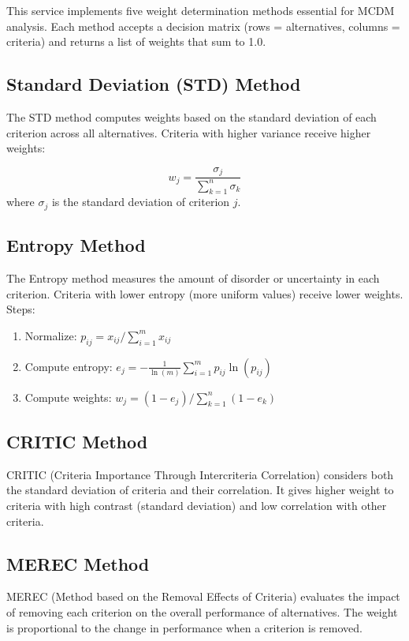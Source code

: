 \documentclass[12pt,a4paper,oneside]{report}
\begin{document}
This service implements five weight determination methods essential for MCDM analysis. Each method accepts a decision matrix (rows = alternatives, columns = criteria) and returns a list of weights that sum to 1.0.

\subsection{Standard Deviation (STD) Method}

The STD method computes weights based on the standard deviation of each criterion across all alternatives. Criteria with higher variance receive higher weights:

\begin{equation}
w_j = \frac{\sigma_j}{\sum_{k=1}^{n} \sigma_k}
\end{equation}
where $\sigma_j$ is the standard deviation of criterion $j$.

\subsection{Entropy Method}

The Entropy method measures the amount of disorder or uncertainty in each criterion. Criteria with lower entropy (more uniform values) receive lower weights. Steps:
\begin{enumerate}
  \item Normalize: $p_{ij} = x_{ij} / \sum_{i=1}^{m} x_{ij}$
  \item Compute entropy: $e_j = -\frac{1}{\ln(m)} \sum_{i=1}^{m} p_{ij} \ln(p_{ij})$
  \item Compute weights: $w_j = (1 - e_j) / \sum_{k=1}^{n} (1 - e_k)$
\end{enumerate}

\subsection{CRITIC Method}

CRITIC (Criteria Importance Through Intercriteria Correlation) considers both the standard deviation of criteria and their correlation. It gives higher weight to criteria with high contrast (standard deviation) and low correlation with other criteria.

\subsection{MEREC Method}

MEREC (Method based on the Removal Effects of Criteria) evaluates the impact of removing each criterion on the overall performance of alternatives. The weight is proportional to the change in performance when a criterion is removed.
\end{document}
